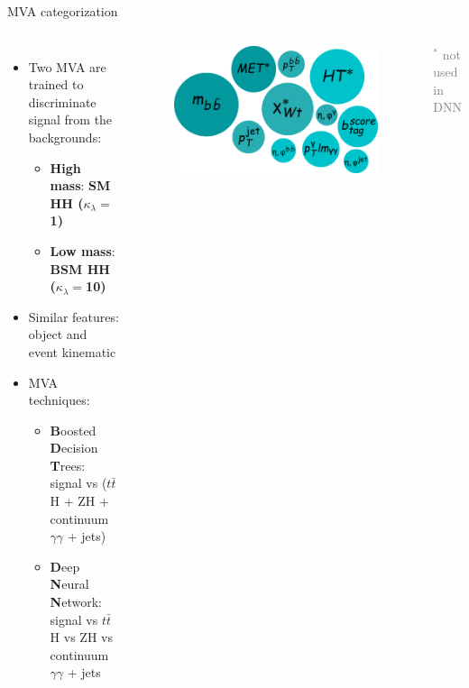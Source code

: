 \begin{frame}{MVA categorization}

\begin{columns}
\begin{itemize}
    \item Two MVA are trained to discriminate signal from the backgrounds:
    \begin{itemize}
        \item \textbf{High mass}: \textbf{\textcolor{HHred}{SM HH ($\kappa_{\lambda} = $1)}}
        \item \textbf{Low mass}: \textbf{\textcolor{HHturquoise_d}{BSM HH ($\kappa_{\lambda} = $10)}}
    \end{itemize}
    \item Similar features: object and event kinematic
    \item MVA techniques: 
    \begin{itemize}
        \item \textcolor{structurColor}{\textbf{B}oosted \textbf{D}ecision \textbf{T}rees}: signal vs ($t\bar{t}$H + ZH + continuum $\gamma\gamma$ + jets)
        \item \textbf{D}eep \textbf{N}eural \textbf{N}etwork: signal vs $t\bar{t}$H vs ZH vs continuum $\gamma\gamma$ + jets
    \end{itemize}
\end{itemize}  


\begin{figure}
    
    \includegraphics[width=1.\textwidth]{Part3/Img/MVA_vars.png}
\end{figure}
\textcolor{gray}{$^{*}$ not used in DNN} \\


\end{columns}   
\end{frame}

